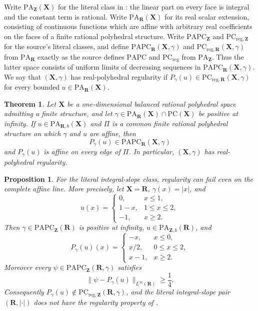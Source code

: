 \documentclass[11pt,a4paper]{article}
\newtheorem{theorem}{Theorem}[section]
\newtheorem{proposition}[proposition]{Proposition}
\theoremstyle{definition}
\theoremstyle{remark}
\begin{document}
Write $\mathrm{PA}_{\mathbf Z}(\mathbf X)$ for the literal class in
\cite[Definition~2.28]{BMPS26}: the linear part on every face is integral and
the constant term is rational.  Write
$\mathrm{PA}_{\mathbf R}(\mathbf X)$ for its real scalar extension, consisting
of continuous functions which are affine with arbitrary real coefficients on
the faces of a finite rational polyhedral structure.  Write
$\mathrm{PAPC}_{\mathbf Z}$ and
$\mathrm{PC}_{\mathrm{reg},\mathbf Z}$ for the source's literal classes, and
define
$\mathrm{PAPC}_{\mathbf R}(\mathbf X,\gamma)$ and
$\mathrm{PC}_{\mathrm{reg},\mathbf R}(\mathbf X,\gamma)$ from
$\mathrm{PA}_{\mathbf R}$ exactly as the source defines $\mathrm{PAPC}$ and
$\mathrm{PC}_{\mathrm{reg}}$ from $\mathrm{PA}_{\mathbf Z}$.  Thus the latter
space consists of uniform limits of decreasing sequences in
$\mathrm{PAPC}_{\mathbf R}(\mathbf X,\gamma)$.  We say that
$(\mathbf X,\gamma)$ has real-polyhedral regularity if
$P_\gamma(u)\in\mathrm{PC}_{\mathrm{reg},\mathbf R}(\mathbf X,\gamma)$ for
every bounded $u\in\mathrm{PA}_{\mathbf R}(\mathbf X)$.

\begin{theorem}
\label{thm:frontier-polyhedral-one-dimensional-real-regularity}
Let $\mathbf X$ be a one-dimensional balanced rational polyhedral space
admitting a finite structure, and let
$\gamma\in\mathrm{PA}_{\mathbf R}(\mathbf X)\cap
\mathrm{PC}(\mathbf X)$ be positive at infinity.  If
$u\in\mathrm{PA}_{\mathbf R,b}(\mathbf X)$ and $\Pi$ is a common finite
rational polyhedral structure on which $\gamma$ and $u$ are affine, then
\[
 P_\gamma(u)\in
 \mathrm{PAPC}_{\mathbf R}(\mathbf X,\gamma)
\]
and $P_\gamma(u)$ is affine on every edge of $\Pi$.  In particular,
$(\mathbf X,\gamma)$ has real-polyhedral regularity.
\end{theorem}

\begin{proposition}
\label{prop:frontier-polyhedral-integral-regularity-counterexample}
For the literal integral-slope class, regularity can fail even on the complete
affine line.  More precisely, let $\mathbf X=\mathbf R$,
$\gamma(x)=|x|$, and
\[
 u(x)=
 \begin{cases}
  0,&x\leq1,\\
  1-x,&1\leq x\leq2,\\
  -1,&x\geq2.
 \end{cases}
\]
Then $\gamma\in\mathrm{PAPC}_{\mathbf Z}(\mathbf R)$ is positive at infinity,
$u\in\mathrm{PA}_{\mathbf Z,b}(\mathbf R)$, and
\[
 P_\gamma(u)(x)=
 \begin{cases}
  -x,&x\leq0,\\
  x/2,&0\leq x\leq2,\\
  x-1,&x\geq2.
 \end{cases}
\]
Moreover every
$\psi\in\mathrm{PAPC}_{\mathbf Z}(\mathbf R,\gamma)$ satisfies
\[
 \lVert\psi-P_\gamma(u)\rVert_{L^\infty(\mathbf R)}\geq\frac14.
\]
Consequently
$P_\gamma(u)\notin\mathrm{PC}_{\mathrm{reg},\mathbf Z}
(\mathbf R,\gamma)$, and the literal integral-slope pair
$(\mathbf R,|\cdot|)$ does not have the regularity property of
\cite[Theorem~6.4 and Definition~6.5]{BMPS26}.
\end{proposition}
\end{document}
